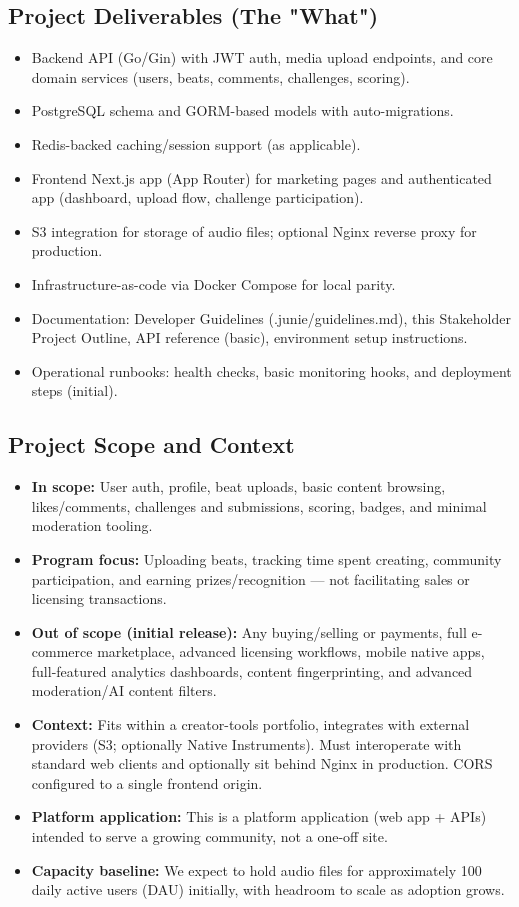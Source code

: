 \documentclass[12pt,a4paper]{article}
\begin{document}
\subsection{Project Deliverables (The "What")}
\begin{itemize}
\item Backend API (Go/Gin) with JWT auth, media upload endpoints, and core domain services (users, beats, comments, challenges, scoring).
\item PostgreSQL schema and GORM-based models with auto-migrations.
\item Redis-backed caching/session support (as applicable).
\item Frontend Next.js app (App Router) for marketing pages and authenticated app (dashboard, upload flow, challenge participation).
\item S3 integration for storage of audio files; optional Nginx reverse proxy for production.
\item Infrastructure-as-code via Docker Compose for local parity.
\item Documentation: Developer Guidelines (.junie/guidelines.md), this Stakeholder Project Outline, API reference (basic), environment setup instructions.
\item Operational runbooks: health checks, basic monitoring hooks, and deployment steps (initial).
\end{itemize}

\subsection{Project Scope and Context}
\begin{itemize}
\item \textbf{In scope:} User auth, profile, beat uploads, basic content browsing, likes/comments, challenges and submissions, scoring, badges, and minimal moderation tooling.
\item \textbf{Program focus:} Uploading beats, tracking time spent creating, community participation, and earning prizes/recognition --- not facilitating sales or licensing transactions.
\item \textbf{Out of scope (initial release):} Any buying/selling or payments, full e-commerce marketplace, advanced licensing workflows, mobile native apps, full-featured analytics dashboards, content fingerprinting, and advanced moderation/AI content filters.
\item \textbf{Context:} Fits within a creator-tools portfolio, integrates with external providers (S3; optionally Native Instruments). Must interoperate with standard web clients and optionally sit behind Nginx in production. CORS configured to a single frontend origin.
\item \textbf{Platform application:} This is a platform application (web app + APIs) intended to serve a growing community, not a one-off site.
\item \textbf{Capacity baseline:} We expect to hold audio files for approximately 100 daily active users (DAU) initially, with headroom to scale as adoption grows.
\end{itemize}
\end{document}
